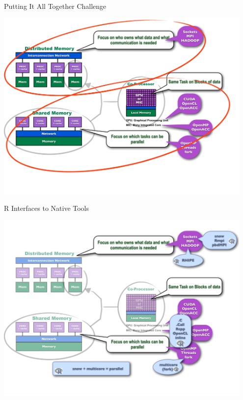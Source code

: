 \begin{frame}
\begin{block}{Putting It All Together Challenge}
    
\includegraphics[width=0.95\textwidth]
{../common/pics/hardware/ParallelHardware9.pdf}
\end{block}
\end{frame}

\begin{frame}
\begin{block}{R Interfaces to Native Tools}
    
\includegraphics[width=0.95\textwidth]
{../common/pics/hardware/ParallelHardware10.pdf}
\end{block}
\end{frame}

